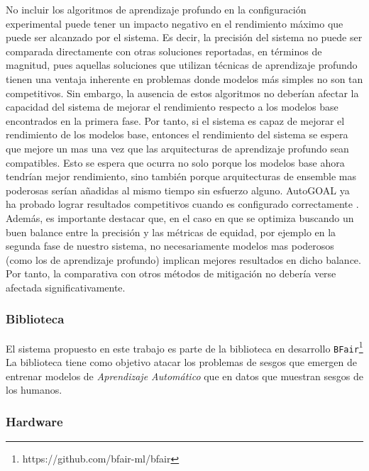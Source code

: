 No incluir los algoritmos de aprendizaje profundo en la configuración experimental puede tener un impacto negativo en el rendimiento máximo que puede ser alcanzado por el sistema.
Es decir, la precisión del sistema no puede ser comparada directamente con otras soluciones reportadas, en términos de magnitud, pues aquellas soluciones que utilizan técnicas de aprendizaje profundo tienen una ventaja inherente en problemas donde modelos más simples no son tan competitivos.
Sin embargo, la ausencia de estos algoritmos no deberían afectar la capacidad del sistema de mejorar el rendimiento respecto a los modelos base encontrados en la primera fase.
Por tanto, si el sistema es capaz de mejorar el rendimiento de los modelos base, entonces el rendimiento del sistema se espera que mejore un mas una vez que las arquitecturas de aprendizaje profundo sean compatibles.
Esto se espera que ocurra no solo porque los modelos base ahora tendrían mejor rendimiento, sino también porque arquitecturas de ensemble mas poderosas serían añadidas al mismo tiempo sin esfuerzo alguno.
AutoGOAL ya ha probado lograr resultados competitivos cuando es configurado correctamente \parencite{estevez2020automatic}.
Además, es importante destacar que, en el caso en que se optimiza buscando un buen balance entre la precisión y las métricas de equidad, por ejemplo en la segunda fase de nuestro sistema, no necesariamente modelos mas poderosos (como los de aprendizaje profundo) implican mejores resultados en dicho balance.
Por tanto, la comparativa con otros métodos de mitigación no debería verse afectada significativamente.

\subsubsection{Biblioteca}\label{section:library}

El sistema propuesto en este trabajo es parte de la biblioteca en desarrollo \texttt{BFair}\footnote{https://github.com/bfair-ml/bfair}
La biblioteca tiene como objetivo atacar los problemas de sesgos que emergen de entrenar modelos de \emph{Aprendizaje Automático} que en datos que muestran sesgos de los humanos.


\subsubsection{Hardware}\label{section:hardware}


